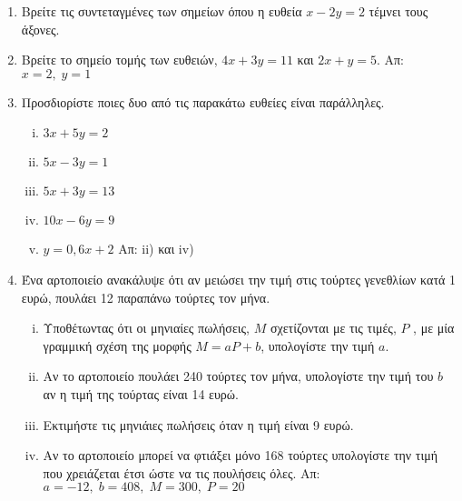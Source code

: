 


\pagestyle{askhseis}



\begin{center}
  \minibox{\bfseries\large \textcolor{Col1}{Ασκήσεις Επανάληψης}}
\end{center}

\vspace{\baselineskip}

\begin{enumerate}
  \item Βρείτε τις συντεταγμένες των σημείων όπου η ευθεία $ x-2y=2 $ τέμνει 
    τους άξονες.
  \item Βρείτε το σημείο τομής των ευθειών, $4x+3y=11$ και $2x+y=5$.
    \hfill Απ: $ x=2,\; y=1 $ 
  \item Προσδιορίστε ποιες δυο από τις παρακάτω ευθείες είναι παράλληλες.
    \begin{enumerate}[i)]
      \item $ 3x+5y=2 $
      \item $ 5x-3y=1 $
      \item $ 5x+3y=13 $
      \item $ 10x-6y=9 $
      \item $ y=0,6x+2 $ \hfill Απ: ii) και iv) 
    \end{enumerate}
  \item Ένα αρτοποιείο ανακάλυψε ότι αν μειώσει την τιμή στις τούρτες
    γενεθλίων κατά 1 ευρώ, πουλάει 12 παραπάνω τούρτες τον μήνα.
    \begin{enumerate}[i)]
      \item Υποθέτωντας ότι οι μηνιαίες πωλήσεις, $M$ σχετίζονται
        με τις τιμές, $P$ , με μία γραμμική σχέση της μορφής
        $ M=aP+b $, υπολογίστε την τιμή $ a $.

      \item Αν το αρτοποιείο πουλάει 240 τούρτες τον μήνα, υπολογίστε
        την τιμή του $b$ αν η τιμή της τούρτας είναι 14 ευρώ.

      \item Εκτιμήστε τις μηνιάιες πωλήσεις όταν η τιμή είναι 9 ευρώ.

      \item Αν το αρτοποιείο μπορεί να φτιάξει μόνο 168 τούρτες
        υπολογίστε την τιμή που χρειάζεται έτσι ώστε να τις πουλήσεις
        όλες.
        \hfill Απ: $ a=-12,\; b=408,\; M=300,\; P=20 $ 
    \end{enumerate}



\end{enumerate}
